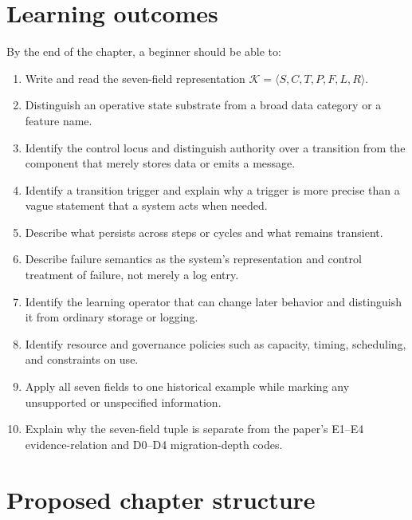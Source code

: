 \section{Learning outcomes}
By the end of the chapter, a beginner should be able to:
\begin{enumerate}
  \item Write and read the seven-field representation $\mathcal{K}=\langle S,C,T,P,F,L,R\rangle$.
  \item Distinguish an operative state substrate from a broad data category or a feature name.
  \item Identify the control locus and distinguish authority over a transition from the component that merely stores data or emits a message.
  \item Identify a transition trigger and explain why a trigger is more precise than a vague statement that a system acts when needed.
  \item Describe what persists across steps or cycles and what remains transient.
  \item Describe failure semantics as the system's representation and control treatment of failure, not merely a log entry.
  \item Identify the learning operator that can change later behavior and distinguish it from ordinary storage or logging.
  \item Identify resource and governance policies such as capacity, timing, scheduling, and constraints on use.
  \item Apply all seven fields to one historical example while marking any unsupported or unspecified information.
  \item Explain why the seven-field tuple is separate from the paper's E1--E4 evidence-relation and D0--D4 migration-depth codes.
\end{enumerate}

\section*{Proposed chapter structure}

